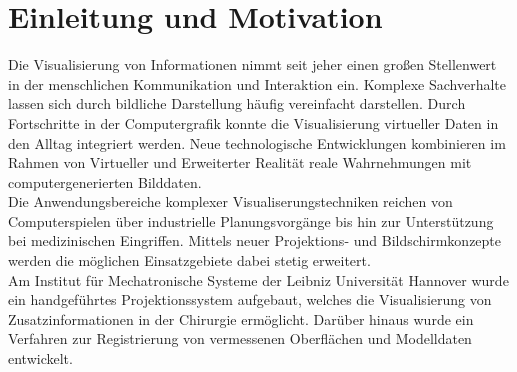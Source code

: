 \chapter{Einleitung und Motivation}


Die Visualisierung von Informationen nimmt seit jeher einen großen Stellenwert in der menschlichen Kommunikation und Interaktion ein. Komplexe Sachverhalte lassen sich durch bildliche Darstellung häufig vereinfacht darstellen. Durch Fortschritte in der Computergrafik konnte die Visualisierung virtueller Daten in den Alltag integriert werden. Neue technologische Entwicklungen kombinieren im Rahmen von Virtueller und Erweiterter Realität reale Wahrnehmungen mit computergenerierten Bilddaten.\\

Die Anwendungsbereiche komplexer Visualiserungstechniken reichen von Computerspielen über industrielle Planungsvorgänge bis hin zur Unterstützung bei medizinischen Eingriffen. Mittels neuer Projektions- und Bildschirmkonzepte werden die möglichen Einsatzgebiete dabei stetig erweitert.\\
Am Institut für Mechatronische Systeme der Leibniz Universität Hannover wurde ein handgeführtes Projektionssystem aufgebaut, welches die Visualisierung von Zusatzinformationen in der Chirurgie ermöglicht. Darüber hinaus wurde ein Verfahren zur Registrierung von vermessenen Oberflächen und Modelldaten entwickelt.\\

